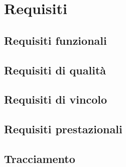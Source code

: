 \section{Requisiti}
\subsection{Requisiti funzionali}
\subsection{Requisiti di qualità}
\subsection{Requisiti di vincolo}
\subsection{Requisiti prestazionali}
\subsection{Tracciamento}